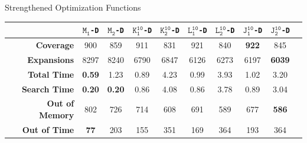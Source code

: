 \documentclass[aspectratio=169, xcolor=dvipsnames]{beamer}
\begin{document}
    \begin{frame}[c]{Strengthened Optimization Functions}
        \begin{table}[h!]
            \center
            \begin{tabular}{|r|c|c|c|c|c|c|c|c|c|}
                \hline
                & \textbf{$\texttt{M}_{\texttt{1}}$\texttt{-D}} & \textbf{$\texttt{M}_{\texttt{2}}$\texttt{-D}} & \textbf{$\texttt{K}_{\texttt{1}}^{\texttt{10}}$\texttt{-D}} & \textbf{$\texttt{K}_{\texttt{2}}^{\texttt{10}}$\texttt{-D}} & \textbf{$\texttt{L}_{\texttt{1}}^{\texttt{10}}$\texttt{-D}} & \textbf{$\texttt{L}_{\texttt{2}}^{\texttt{10}}$\texttt{-D}} & \textbf{$\texttt{J}_{\texttt{1}}^{\texttt{10}}$\texttt{-D}} & \textbf{$\texttt{J}_{\texttt{2}}^{\texttt{10}}$\texttt{-D}}\\
                \hline \hline
                \textbf{Coverage}       & 900 & 859 & 911 & 831 & 921 & 840 & \textbf{922}  & 845   \\ \hline
                \textbf{Expansions}     & 8297 & 8240 & 6790 & 6847 & 6126 & 6273 & 6197 & \textbf{6039} \\ \hline
                \textbf{Total Time}     & \textbf{0.59} & 1.23 & 0.89 & 4.23 & 0.99 & 3.93 & 1.02 & 3.20  \\ \hline
                \textbf{Search Time}    & \textbf{0.20} & \textbf{0.20} & 0.86 & 4.08 & 0.86 & 3.78 & 0.89 & 3.04  \\ \hline
                \textbf{Out of Memory}  & 802 & 726 & 714 & 608 & 691 & 589 & 677 & \textbf{586}   \\ \hline
                \textbf{Out of Time}    & \textbf{77}   & 203 & 155 & 351 & 169 & 364 & 193 & 364   \\ \hline
            \end{tabular}
        \end{table}
    \end{frame}
\end{document}
